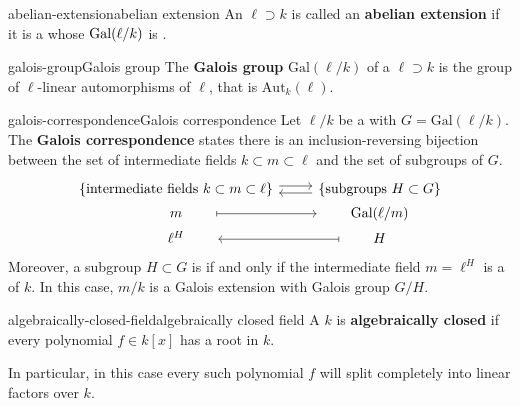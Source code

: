 \begin{topic}{abelian-extension}{abelian extension}
    An   $\ell \supset k$ is called an \textbf{abelian extension} if it is a  whose  $\textup{Gal}(\ell/k)$ is .
\end{topic}

\begin{topic}{galois-group}{Galois group}
    The \textbf{Galois group} $\text{Gal}(\ell/k)$ of a  $\ell \supset k$ is the group of $\ell$-linear automorphisms of $\ell$, that is $\text{Aut}_k(\ell)$.
\end{topic}

\begin{topic}{galois-correspondence}{Galois correspondence}
    Let $\ell/k$ be a  with  $G = \text{Gal}(\ell/k)$. The \textbf{Galois correspondence} states there is an inclusion-reversing bijection between the set of intermediate fields $k \subset m \subset \ell$ and the set of subgroups of $G$.
    \[ \begin{tikzcd}[row sep=0em]
        \{ \text{intermediate fields } k \subset m \subset \ell \} \arrow[shift left=0.25em]{r} & \arrow[shift left=0.25em]{l} \{ \text{subgroups } H \subset G \} \\
        \qquad m \qquad  \arrow[mapsto]{r} & \qquad \text{Gal}(\ell/m) \qquad \\
        \qquad \ell^H \qquad & \arrow[mapsto]{l} \qquad H \qquad 
    \end{tikzcd} \]
    Moreover, a subgroup $H \subset G$ is  if and only if the intermediate field $m = \ell^H$ is a  of $k$. In this case, $m/k$ is a Galois extension with Galois group $G/H$.
\end{topic}

\begin{topic}{algebraically-closed-field}{algebraically closed field}
    A  $k$ is \textbf{algebraically closed} if every polynomial $f \in k[x]$ has a root in $k$.
    
    In particular, in this case every such polynomial $f$ will split completely into linear factors over $k$.
\end{topic}

